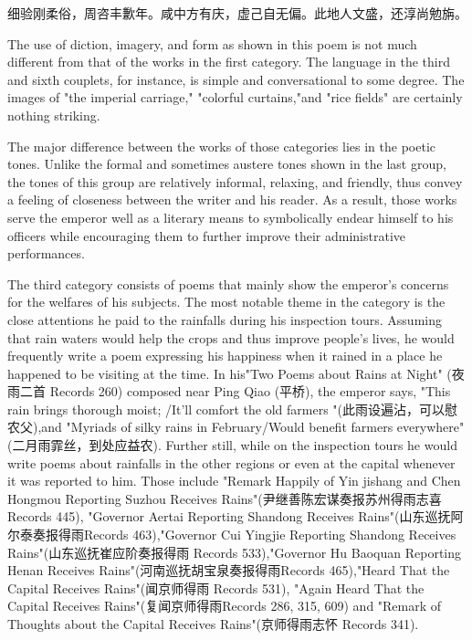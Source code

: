 \begin{BookQuote}
细验刚柔俗，周咨丰歉年。咸中方有庆，虚己自无偏。此地人文盛，还淳尚勉旃。
\end{BookQuote}

The use of diction, imagery, and form as shown in this poem is not much different from that of the works in the first category. The language in the third and sixth couplets, for instance, is simple and conversational to some degree. The images of "the imperial carriage," "colorful curtains,"and "rice fields" are certainly nothing striking.


\noindent The major difference between the works of those categories lies in the poetic tones. Unlike the formal and sometimes austere tones shown in the last group, the tones of this group are relatively informal, relaxing, and friendly, thus convey a feeling of closeness between the writer and his reader. As a result, those works serve the emperor well as a literary means to symbolically endear himself to his officers while encouraging them to further improve their administrative performances.

The third category consists of poems that mainly show the emperor's concerns for the welfares of his subjects. The most notable theme in the category is the close attentions he paid to the rainfalls during his inspection tours. Assuming that rain waters would help the crops and thus improve people's lives, he would frequently write a poem expressing his happiness when it rained in a place he happened to be visiting at the time. In his"Two Poems about Rains at Night" (夜雨二首 Records 260) composed near Ping Qiao (平桥), the emperor says, "This rain brings thorough moist; /It'll comfort the old farmers "(此雨设遍沾，可以慰农父),and "Myriads of silky rains in February/Would benefit farmers everywhere"(二月雨霏丝，到处应益农). Further still, while on the inspection tours he would write poems about rainfalls in the other regions or even at the capital whenever it was reported to him. Those include "Remark Happily of Yin jishang and Chen Hongmou Reporting Suzhou Receives Rains"(尹继善陈宏谋奏报苏州得雨志喜 Records 445), "Governor Aertai Reporting Shandong Receives Rains"(山东巡抚阿尔泰奏报得雨Records 463),"Governor Cui Yingjie Reporting Shandong Receives Rains"(山东巡抚崔应阶奏报得雨 Records 533),"Governor Hu Baoquan Reporting Henan Receives Rains"(河南巡抚胡宝泉奏报得雨Records 465),"Heard That the Capital Receives Rains"(闻京师得雨 Records 531), "Again Heard That the Capital Receives Rains"(复闻京师得雨Records 286, 315, 609) and "Remark of Thoughts about the Capital Receives Rains"(京师得雨志怀 Records 341).

